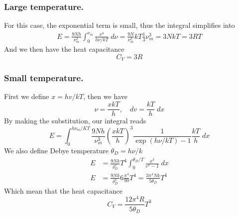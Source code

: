 \documentclass[../../../Main.tex]{subfiles}
\begin{document}
\subsubsection*{Large temperature.} For this case, the exponential term is small, thus the integral simplifies into
\begin{align*}
    E=\frac{9Nh}{\nu_m^3}\int_{0}^{\nu_m}\frac{\nu^3}{h\nu/kT}\;d\nu= \frac{9N}{\nu_m^3}kT\frac{1}{3}\nu_m^3=3NkT=3RT
\end{align*}
And we then have the heat capacitance 
\begin{equation*}
    C_V=3R
\end{equation*}

\subsubsection*{Small temperature.} First we define $x=hv/kT$, then we have 
\begin{equation*}
    \nu=\frac{xkT}{h},\quad dv=\frac{kT}{h}\;dx
\end{equation*}
By making the substitution, our integral reads 
\begin{equation*}
    E=\int_{0}^{h\nu_m/KT}\frac{9Nh}{\nu_m^3}\left(\frac{xkT}{h}\right)^3\frac{1}{\exp(h\nu/kT)-1}\frac{kT}{h}\;dx
\end{equation*}
We also define Debye temperature $\theta_D=h\nu/k$
\begin{align*}
    E&=\frac{9Nk}{\delta_D^3}T^4\int_{0}^{\theta_D/T}\frac{x^3}{e^x-1}\;dx\\
    E&=\frac{9Nk}{\delta_D^3}6\frac{\pi^4}{90}T^4=\frac{3\pi^4Nk}{5\theta_D}T^4
\end{align*}
Which mean that the heat capacitance
\begin{equation*}
    C_V=\frac{12\pi^4R}{5\theta_D}T^3
\end{equation*}
\end{document}
